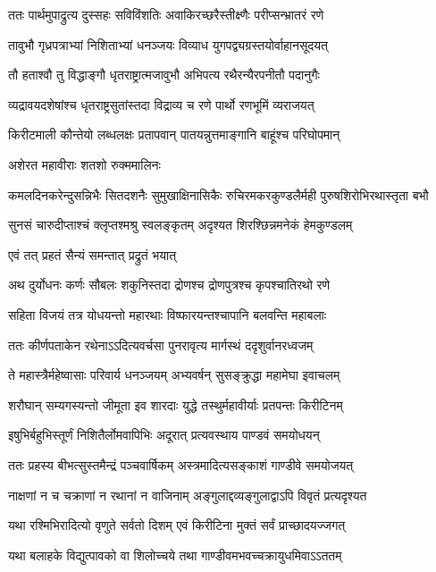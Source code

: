 \twolineshloka
{ततः पार्थमुपाद्रुत्य दुस्सहः सविविंशतिः}
{अवाकिरच्छरैस्तीक्ष्णैः परीप्सन्भ्रातरं रणे}


\twolineshloka
{तावुभौ गृध्रपत्राभ्यां निशिताभ्यां धनञ्जयः}
{विव्याध युगपद्व्यग्रस्तयोर्वाहानसूदयत्}


\twolineshloka
{तौ हताश्वौ तु विद्धाङ्गौ धृतराष्ट्रात्मजावुभौ}
{अभिपत्य रथैरन्यैरपनीतौ पदानुगैः}


\twolineshloka
{व्यद्रावयदशेषांश्च धृतराष्ट्रसुतांस्तदा}
{विद्राव्य च रणे पार्थो रणभूमिं व्यराजयत्}


\twolineshloka
{किरीटमाली कौन्तेयो लब्धलक्षः प्रतापवान्}
{पातयन्नुत्तमाङ्गानि बाहूंश्च परिघोपमान्}


\onelineshloka
{अशेरत महावीराः शतशो रुक्ममालिनः}

\fourlineindentedshloka
{कमलदिनकरेन्दुसन्निभैः}
{सितदशनैः सुमुखाक्षिनासिकैः}
{रुचिरमकरकुण्डलैर्मही}
{पुरुषशिरोभिरथास्तृता बभौ}


\twolineshloka
{सुनसं चारुदीप्ताश्चं क्लृप्तश्मश्रु स्वलङ्कृतम्}
{अदृश्यत शिरश्छिन्नमनेकं हेमकुण्डलम्}


\onelineshloka
{एवं तत् प्रहतं सैन्यं समन्तात् प्रद्रुतं भयात्}

\twolineshloka
{अथ दुर्योधनः कर्णः सौबलः शकुनिस्तदा}
{द्रोणश्च द्रोणपुत्रश्च कृपश्चातिरथो रणे}


\twolineshloka
{सहिता विजयं तत्र योधयन्तो महारथाः}
{विष्फारयन्तश्चापानि बलवन्ति महाबलाः}


\twolineshloka
{ततः कीर्णपताकेन रथेनाऽऽदित्यवर्चसा}
{पुनरावृत्य मार्गस्थं ददृशुर्वानरध्वजम्}


\twolineshloka
{ते महास्त्रैर्महेष्वासाः परिवार्य धनञ्जयम्}
{अभ्यवर्षन् सुसङ्क्रुद्धा महामेघा इवाचलम्}


\twolineshloka
{शरौघान् सम्यगस्यन्तो जीमूता इव शारदाः}
{युद्धे तस्थुर्महावीर्याः प्रतपन्तः किरीटिनम्}


\twolineshloka
{इषुभिर्बहुभिस्तूर्णं निशितैर्लोमवापिभिः}
{अदूरात् प्रत्यवस्थाय पाण्डवं समयोधयन्}


\twolineshloka
{ततः प्रहस्य बीभत्सुस्तमैन्द्रं पञ्चवार्षिकम्}
{अस्त्रमादित्यसङ्काशं गाण्डीवे समयोजयत्}


\twolineshloka
{नाक्षणां न च चक्राणां न रथानां न वाजिनाम्}
{अङ्गुलाद्दव्यङ्गुलाद्वाऽपि विवृतं प्रत्यदृश्यत}


\twolineshloka
{यथा रश्मिभिरादित्यो वृणुते सर्वतो दिशम्}
{एवं किरीटिना मुक्तं सर्वं प्राच्छादयज्जगत्}


\twolineshloka
{यथा बलाहके विद्युत्पावको वा शिलोच्चये}
{तथा गाण्डीवमभवच्चक्रायुधमिवाऽऽततम्}


